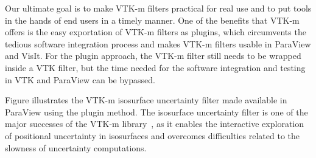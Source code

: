 Our ultimate goal is to make VTK-m filters practical for real use and to put tools in the hands of end users in a timely manner. One of the benefits that VTK-m offers is the easy exportation of VTK-m filters as plugins, which circumvents the tedious software integration process and makes VTK-m filters usable in ParaView and VisIt. For the plugin approach, the VTK-m filter still needs to be wrapped inside a VTK filter, but the time needed for the software integration and testing in VTK and ParaView can be bypassed.       

Figure illustrates the VTK-m isosurface uncertainty filter made available in ParaView using the plugin method. The isosurface uncertainty filter is one of the major successes of the VTK-m library~\cite{wang2023funmc}, as it enables the interactive exploration of positional uncertainty in isosurfaces and overcomes difficulties related to the slowness of uncertainty computations.  

